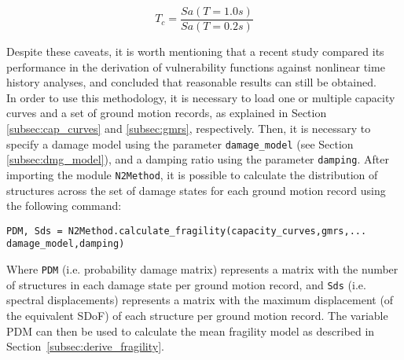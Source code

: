 \begin{equation}
T_c = \frac{Sa(T=1.0s)}{Sa(T=0.2s)}
\end{equation}

Despite these caveats, it is worth mentioning that a recent study \citep{SilvaEtAl2014b} compared its performance in the derivation of vulnerability functions against nonlinear time history analyses, and concluded that reasonable results can still be obtained.\\

In order to use this methodology, it is necessary to load one or multiple capacity curves and a set of ground motion records, as explained in Section \ref{subsec:cap_curves} and \ref{subsec:gmrs}, respectively. Then, it is necessary to specify a damage model using the parameter \verb=damage_model= (see Section \ref{subsec:dmg_model}), and a damping ratio using the parameter \verb=damping=. After importing the module \verb=N2Method=, it is possible to calculate the distribution of structures across the set of damage states for each ground motion record using the following command:

\begin{Verbatim}[frame=single, commandchars=\\\{\}, samepage=true]
PDM, Sds = N2Method.calculate_fragility(capacity_curves,gmrs,...
damage_model,damping)
\end{Verbatim}

Where \verb=PDM= (i.e. probability damage matrix) represents a matrix with the number of structures in each damage state per ground motion record, and \verb=Sds= (i.e. spectral displacements) represents a matrix with the maximum displacement (of the equivalent SDoF) of each structure per ground motion record. The variable PDM can then be used to calculate the mean fragility model as described in Section~\ref{subsec:derive_fragility}.